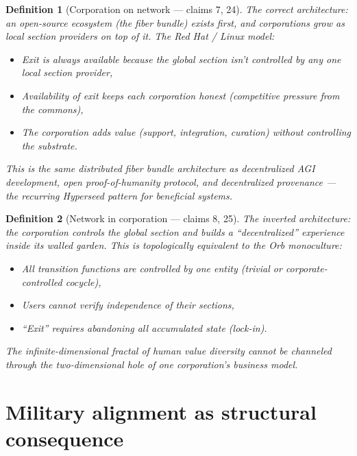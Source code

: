 \documentclass[11pt,a4paper]{article}
\newtheorem{definition}{Definition}[section]
\begin{document}
\begin{definition}[Corporation on network --- claims 7, 24]
\label{def:correct}
The correct architecture: an open-source ecosystem (the fiber bundle)
exists first, and corporations grow as local section providers on top
of it. The Red Hat / Linux model:
\begin{itemize}
\item Exit is always available because the global section isn't
  controlled by any one local section provider,
\item Availability of exit keeps each corporation honest (competitive
  pressure from the commons),
\item The corporation adds value (support, integration, curation) without
  controlling the substrate.
\end{itemize}
This is the same distributed fiber bundle architecture as decentralized
AGI development, open proof-of-humanity protocol, and decentralized
provenance --- the recurring Hyperseed pattern for beneficial systems.
\end{definition}

\begin{definition}[Network in corporation --- claims 8, 25]
\label{def:inverted}
The inverted architecture: the corporation controls the global section
and builds a ``decentralized'' experience inside its walled garden.
This is topologically equivalent to the Orb monoculture:
\begin{itemize}
\item All transition functions are controlled by one entity (trivial
  or corporate-controlled cocycle),
\item Users cannot verify independence of their sections,
\item ``Exit'' requires abandoning all accumulated state (lock-in).
\end{itemize}
The infinite-dimensional fractal of human value diversity cannot be
channeled through the two-dimensional hole of one corporation's
business model.
\end{definition}


\section{Military alignment as structural consequence}
\label{sec:military}
\end{document}
